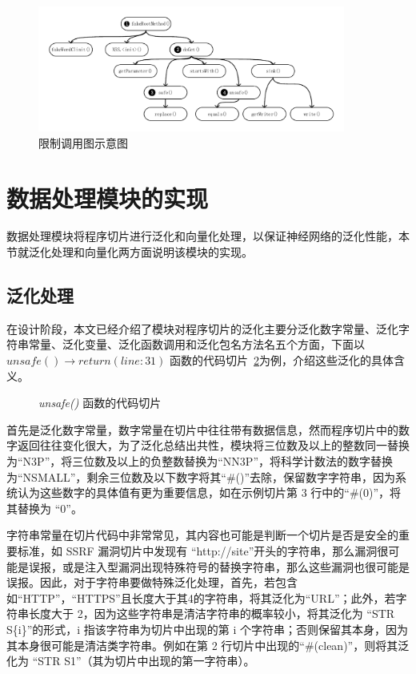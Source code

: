 \begin{figure}[!htb]
    \centering
    \includegraphics[width=0.9\textwidth]{FIGs/chapter4/prune.pdf}
    \caption{限制调用图示意图}\label{prune}
\end{figure}


\section{数据处理模块的实现}

数据处理模块将程序切片进行泛化和向量化处理，以保证神经网络的泛化性能，本节就泛化处理和向量化两方面说明该模块的实现。

\subsection{泛化处理}

在设计阶段，本文已经介绍了模块对程序切片的泛化主要分泛化数字常量、泛化字符串常量、泛化变量、泛化函数调用和泛化包名方法名五个方面，下面以 $unsafe() \rightarrow return(line:31)$ 函数的代码切片~\ref{code:sliceDemo}为例，介绍这些泛化的具体含义。

\begin{figure}[htbp]
    \centering
    \begin{minipage}{0.9\textwidth}
        
    \end{minipage}
    \caption{\textit{unsafe()} 函数的代码切片}\label{code:sliceDemo}
\end{figure}

首先是泛化数字常量，数字常量在切片中往往带有数据信息，然而程序切片中的数字返回往往变化很大，为了泛化总结出共性，模块将三位数及以上的整数同一替换为“N3P”，将三位数及以上的负整数替换为“NN3P”，将科学计数法的数字替换为“NSMALL”，剩余三位数及以下数字将其“\#()”去除，保留数字字符串，因为系统认为这些数字的具体值有更为重要信息，如在示例切片第 3 行中的“\#(0)”，将其替换为 “0”。

字符串常量在切片代码中非常常见，其内容也可能是判断一个切片是否是安全的重要标准，如 SSRF 漏洞切片中发现有 “http://site”开头的字符串，那么漏洞很可能是误报，或是注入型漏洞出现特殊符号的替换字符串，那么这些漏洞也很可能是误报。因此，对于字符串要做特殊泛化处理，首先，若包含如“HTTP”，“HTTPS”且长度大于其4的字符串，将其泛化为“URL”；此外，若字符串长度大于 2，因为这些字符串是清洁字符串的概率较小，将其泛化为 “STR S\{i\}”的形式，i 指该字符串为切片中出现的第 i 个字符串；否则保留其本身，因为其本身很可能是清洁类字符串。例如在第 2 行切片中出现的“\#(clean)”，则将其泛化为 “STR S1”（其为切片中出现的第一字符串）。


